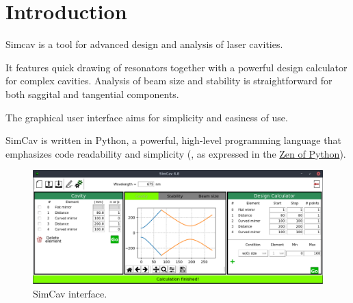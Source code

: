 \documentclass[11pt,a4paper,article,oneside]{memoir}
\title{}
\author{Julio M. Rodríguez-García}
\date{}
\begin{document}
	\graphicspath{{./Figures/}}
	
	\maketitle
	
	\mainmatter
	\section{Introduction}
	Simcav is a tool for advanced design and analysis of laser cavities. 
	
	It features quick drawing of resonators together with a powerful design calculator for complex cavities. Analysis of beam size and stability is straightforward for both saggital and tangential components. 
	
	The graphical user interface aims for simplicity and easiness of use. 
	
	SimCav is written in Python, a powerful, high-level programming language that emphasizes code readability and simplicity (, as expressed in the \href{https://www.python.org/dev/peps/pep-0020/}{Zen of Python}).

	\begin{figure}[h!]
		\centering
		\includegraphics[width=0.8\linewidth]{simcav.png}
		\caption[SimCav]{SimCav interface.}
		\label{fig:simcav}
	\end{figure}
\end{document}
